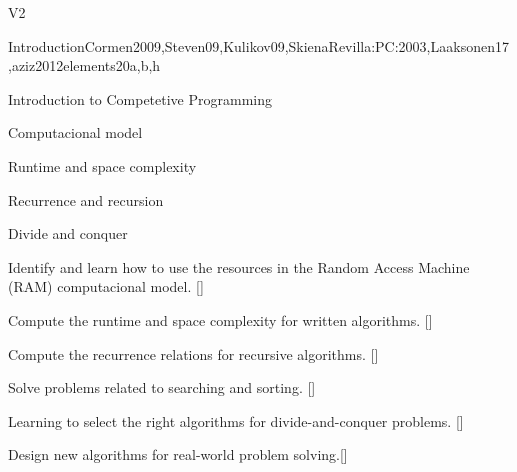 \begin{syllabus}
  \begin{competences}{V2}
      \item {}
      \item {}
      \item {}
  \end{competences}
  
  \begin{unit}{Introduction}{}{Cormen2009,Steven09,Kulikov09,SkienaRevilla:PC:2003,Laaksonen17,aziz2012elements}{20}{a,b,h}
    \begin{topics}
      \item Introduction to Competetive Programming
      \item Computacional model
      \item Runtime and space complexity
      \item Recurrence and recursion
      \item Divide and conquer
    \end{topics}
    \begin{learningoutcomes}
          \item Identify and learn how to use the resources in the Random Access Machine (RAM) computacional model. [\Usage] 
          \item Compute the runtime and space complexity for written algorithms. [\Usage]
          \item Compute the recurrence relations for recursive algorithms. [\Usage]
          \item Solve problems related to searching and sorting. [\Usage]
          \item Learning to select the right algorithms for divide-and-conquer problems. [\Usage] 
        \item Design new algorithms for real-world problem solving.[\Usage]
    \end{learningoutcomes}
  \end{unit}
  

\end{syllabus}
